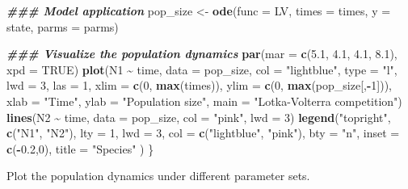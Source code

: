 \documentclass[
]{book}
\newenvironment{Shaded}{\begin{snugshade}}{\end{snugshade}}
\newcommand{\AttributeTok}[1]{\textcolor[rgb]{0.13,0.29,0.53}{#1}}
\newcommand{\ConstantTok}[1]{\textcolor[rgb]{0.56,0.35,0.01}{#1}}
\newcommand{\DecValTok}[1]{\textcolor[rgb]{0.00,0.00,0.81}{#1}}
\newcommand{\DocumentationTok}[1]{\textcolor[rgb]{0.56,0.35,0.01}{\textbf{\textit{#1}}}}
\newcommand{\FloatTok}[1]{\textcolor[rgb]{0.00,0.00,0.81}{#1}}
\newcommand{\FunctionTok}[1]{\textcolor[rgb]{0.13,0.29,0.53}{\textbf{#1}}}
\newcommand{\NormalTok}[1]{#1}
\newcommand{\OtherTok}[1]{\textcolor[rgb]{0.56,0.35,0.01}{#1}}
\newcommand{\SpecialCharTok}[1]{\textcolor[rgb]{0.81,0.36,0.00}{\textbf{#1}}}
\newcommand{\StringTok}[1]{\textcolor[rgb]{0.31,0.60,0.02}{#1}}
\begin{document}
\begin{Shaded}
\begin{Highlighting}[]
  \DocumentationTok{\#\#\# Model application}
\NormalTok{  pop\_size }\OtherTok{\textless{}{-}} \FunctionTok{ode}\NormalTok{(}\AttributeTok{func =}\NormalTok{ LV, }\AttributeTok{times =}\NormalTok{ times, }\AttributeTok{y =}\NormalTok{ state, }\AttributeTok{parms =}\NormalTok{ parms)}

  \DocumentationTok{\#\#\# Visualize the population dynamics}
  \FunctionTok{par}\NormalTok{(}\AttributeTok{mar =} \FunctionTok{c}\NormalTok{(}\FloatTok{5.1}\NormalTok{, }\FloatTok{4.1}\NormalTok{, }\FloatTok{4.1}\NormalTok{, }\FloatTok{8.1}\NormalTok{), }\AttributeTok{xpd =} \ConstantTok{TRUE}\NormalTok{)}
  \FunctionTok{plot}\NormalTok{(N1 }\SpecialCharTok{\textasciitilde{}}\NormalTok{ time, }\AttributeTok{data =}\NormalTok{ pop\_size,}
       \AttributeTok{col =} \StringTok{"lightblue"}\NormalTok{, }\AttributeTok{type =} \StringTok{"l"}\NormalTok{, }\AttributeTok{lwd =} \DecValTok{3}\NormalTok{,}
       \AttributeTok{las =} \DecValTok{1}\NormalTok{,}
       \AttributeTok{xlim =} \FunctionTok{c}\NormalTok{(}\DecValTok{0}\NormalTok{, }\FunctionTok{max}\NormalTok{(times)), }\AttributeTok{ylim =} \FunctionTok{c}\NormalTok{(}\DecValTok{0}\NormalTok{, }\FunctionTok{max}\NormalTok{(pop\_size[,}\SpecialCharTok{{-}}\DecValTok{1}\NormalTok{])),}
       \AttributeTok{xlab =} \StringTok{"Time"}\NormalTok{,}
       \AttributeTok{ylab =} \StringTok{"Population size"}\NormalTok{,}
       \AttributeTok{main =} \StringTok{"Lotka{-}Volterra competition"}\NormalTok{)}
  \FunctionTok{lines}\NormalTok{(N2 }\SpecialCharTok{\textasciitilde{}}\NormalTok{ time, }\AttributeTok{data =}\NormalTok{ pop\_size, }\AttributeTok{col =} \StringTok{"pink"}\NormalTok{, }\AttributeTok{lwd =} \DecValTok{3}\NormalTok{)}
  \FunctionTok{legend}\NormalTok{(}\StringTok{"topright"}\NormalTok{,}
       \FunctionTok{c}\NormalTok{(}\StringTok{"N1"}\NormalTok{, }\StringTok{"N2"}\NormalTok{),}
       \AttributeTok{lty =} \DecValTok{1}\NormalTok{, }\AttributeTok{lwd =} \DecValTok{3}\NormalTok{,}
       \AttributeTok{col =} \FunctionTok{c}\NormalTok{(}\StringTok{"lightblue"}\NormalTok{, }\StringTok{"pink"}\NormalTok{),}
       \AttributeTok{bty =} \StringTok{"n"}\NormalTok{,}
       \AttributeTok{inset =} \FunctionTok{c}\NormalTok{(}\SpecialCharTok{{-}}\FloatTok{0.2}\NormalTok{,}\DecValTok{0}\NormalTok{),}
       \AttributeTok{title =} \StringTok{"Species"}
\NormalTok{       )}
\NormalTok{\}}
\end{Highlighting}
\end{Shaded}

Plot the population dynamics under different parameter sets.
\end{document}
